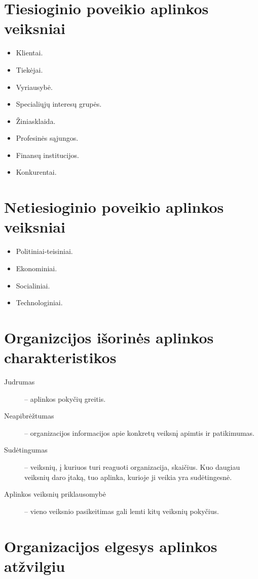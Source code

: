 \section{Tiesioginio poveikio aplinkos veiksniai}

\begin{itemize}
  \item Klientai.
  \item Tiekėjai.
  \item Vyriausybė.
  \item Specialiųjų interesų grupės.
  \item Žiniasklaida.
  \item Profesinės sąjungos.
  \item Finansų institucijos.
  \item Konkurentai.
\end{itemize}

\section{Netiesioginio poveikio aplinkos veiksniai}

\begin{itemize}
  \item Politiniai-teisiniai.
  \item Ekonominiai.
  \item Socialiniai.
  \item Technologiniai.
\end{itemize}

\section{Organizcijos išorinės aplinkos charakteristikos}

\begin{description}
  \item[Judrumas] – aplinkos pokyčių greitis.
  \item[Neapibrėžtumas] – organizacijos informacijos apie konkretų
    veiksnį apimtis ir patikimumas.
  \item[Sudėtingumas] – veiksnių, į kuriuos turi reaguoti organizacija,
    skaičius. Kuo daugiau veiksnių daro įtaką, tuo aplinka, kurioje
    ji veikia yra sudėtingesnė.
  \item[Aplinkos veiksnių priklausomybė] – vieno veiksnio pasikeitimas
    gali lemti kitų veiksnių pokyčius.
\end{description}

\section{Organizacijos elgesys aplinkos atžvilgiu}

